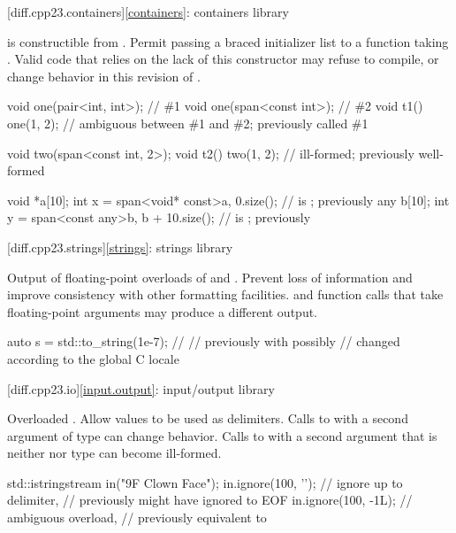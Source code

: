 [diff.cpp23.containers]{\ref{containers}: containers library}

\change
{} is constructible from .
\rationale
Permit passing a braced initializer list to a function taking .
\effect
Valid \CppXXIII{} code that relies on the lack of this constructor
may refuse to compile, or change behavior in this revision of \Cpp{}.
\begin{example}
\begin{codeblock}
void one(pair<int, int>);       // \#1
void one(span<const int>);      // \#2
void t1() { one({1, 2}); }      // ambiguous between \#1 and \#2; previously called \#1

void two(span<const int, 2>);
void t2() { two({{1, 2}}); }    // ill-formed; previously well-formed

void *a[10];
int x = span<void* const>{a, 0}.size();     //  is ; previously 
any b[10];
int y = span<const any>{b, b + 10}.size();  //  is ; previously 
\end{codeblock}
\end{example}

[diff.cpp23.strings]{\ref{strings}: strings library}

\change
Output of floating-point overloads of  and .
\rationale
Prevent loss of information and improve consistency with other formatting
facilities.
\effect
{} and  function calls that take
floating-point arguments may produce a different output.
\begin{example}
\begin{codeblock}
auto s = std::to_string(1e-7);  // 
                                // previously  with  possibly
                                // changed according to the global C locale
\end{codeblock}
\end{example}

[diff.cpp23.io]{\ref{input.output}: input/output library}

\change
Overloaded .
\rationale
Allow  values to be used as delimiters.
\effect
Calls to  with a second argument of  type
can change behavior.
Calls to  with a second argument that is neither
 nor  type can become ill-formed.
\begin{example}
\begin{codeblock}
std::istringstream in("\x9F Clown Face");
in.ignore(100, '');     // ignore up to  delimiter,
                            // previously might have ignored to EOF
in.ignore(100, -1L);        // ambiguous overload,
                            // previously equivalent to 
\end{codeblock}
\end{example}

